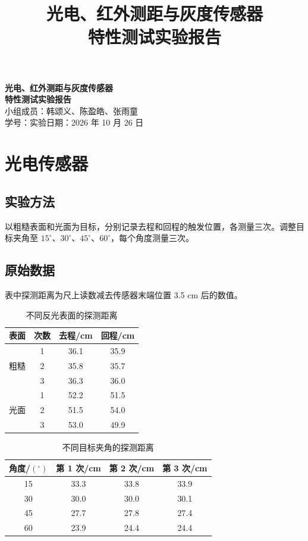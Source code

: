 \documentclass[UTF8,a4paper,12pt]{ctexart}
\title{光电、红外测距与灰度传感器\\特性测试实验报告}
\author{}
\begin{document}
\begin{center}
{\LARGE\bfseries 光电、红外测距与灰度传感器}\\[6pt]
{\LARGE\bfseries 特性测试实验报告}\\[18pt]
{
小组成员：韩颂义、陈盈皓、张雨童\\[4pt]
学号：\underline{\hspace{3.0cm}}\quad 实验日期：2026 年 10 月 26 日}
\end{center}

\vspace{1.2em}


\section{光电传感器}
\subsection{实验方法}
以粗糙表面和光面为目标，分别记录去程和回程的触发位置，各测量三次。调整目标夹角至 $15^{\circ}$、$30^{\circ}$、$45^{\circ}$、$60^{\circ}$，每个角度测量三次。

\subsection{原始数据}
表中探测距离为尺上读数减去传感器末端位置 3.5 cm 后的数值。

\begin{table}[H]
  \centering
  \caption{不同反光表面的探测距离}
  \label{tab:photo-surface}
  \begin{tabular}{cccc}
    \toprule
    表面 & 次数 & 去程/cm & 回程/cm \\
    \midrule
    \multirow{3}{*}{粗糙} & 1 & 36.1 & 35.9 \\
     & 2 & 35.8 & 35.7 \\
     & 3 & 36.3 & 36.0 \\
    \midrule
    \multirow{3}{*}{光面} & 1 & 52.2 & 51.5 \\
     & 2 & 51.5 & 54.0 \\
     & 3 & 53.0 & 49.9 \\
    \bottomrule
  \end{tabular}
\end{table}

\begin{table}[H]
  \centering
  \caption{不同目标夹角的探测距离}
  \label{tab:photo-angle}
  \begin{tabular}{cccc}
    \toprule
    角度/$({}^{\circ})$ & 第 1 次/cm & 第 2 次/cm & 第 3 次/cm \\
    \midrule
    15 & 33.3 & 33.8 & 33.9 \\
    30 & 30.0 & 30.0 & 30.1 \\
    45 & 27.7 & 27.8 & 27.4 \\
    60 & 23.9 & 24.4 & 24.4 \\
    \bottomrule
  \end{tabular}
\end{table}
\end{document}
